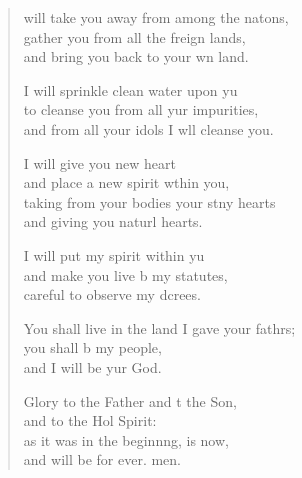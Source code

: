 \settowidth{\versewidth}{You shall live in the land I gave your fathers; +}
\begin{verse}%
  \begin{patverse}
 will take you away from among the nat\pointup{\i}ons,\Flex\\
gather you from all the freign lands,\Med\\
and bring you back to your wn land.

I will sprinkle clean water upon yu\Flex\\
to cleanse you from all yur impurities,\Med\\
and from all your idols I w\pointup{\i}ll cleanse you.

I will give you  new heart\Med\\
and place a new spirit w\pointup{\i}thin you,\\
taking from your bodies your stny hearts\Med\\
and giving you naturl hearts.

I will put my spirit within yu\Flex\\
and make you live b my statutes,\Med\\
careful to observe my dcrees.

You shall live in the land I gave your fathrs;\Flex\\
you shall b my people,\Med\\
and I will be yur God.

Glory to the Father and t the Son,\Med\\
and to the Hol Spirit:\\
as it was in the beginn\pointup{\i}ng, is now,\Med\\
and will be for ever. men.
  \end{patverse}
  \end{verse}
